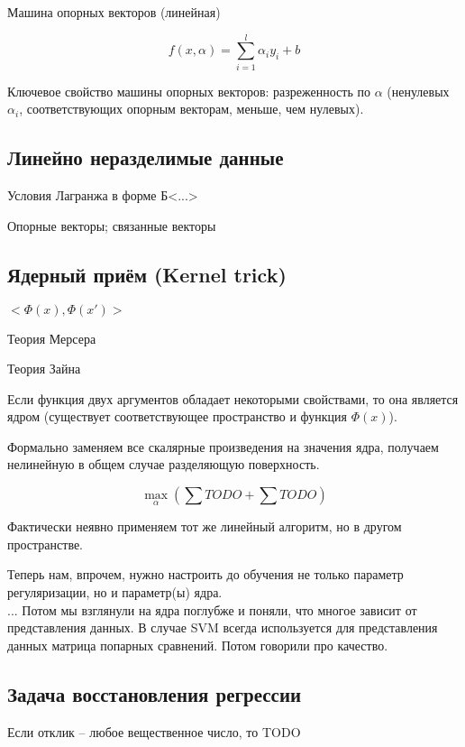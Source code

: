\documentclass[main.tex]{subfiles}
\begin{document}
Машина опорных векторов (линейная)

\[ \boxed{ f(x, \alpha) = \sum_{i=1}^l \alpha_i y_i + b } \]

Ключевое свойство машины опорных векторов: разреженность по $ \alpha $ (ненулевых $ \alpha_i $, соответствующих опорным векторам, меньше, чем нулевых).

\subsection{Линейно неразделимые данные}

Условия Лагранжа в форме Б<...>

Опорные векторы; связанные векторы

\subsection{Ядерный приём (Kernel trick)}

$ < \Phi(x), \Phi(x') > $

Теория Мерсера

Теория Зайна

Если функция двух аргументов обладает некоторыми свойствами, то она является ядром (существует соответствующее пространство и функция $ \Phi(x) $).

Формально заменяем все скалярные произведения на значения ядра, получаем нелинейную в общем случае разделяющую поверхность.

\[ \max_\alpha \left( \sum TODO + \sum TODO \right) \]

Фактически неявно применяем тот же линейный алгоритм, но в другом пространстве.

Теперь нам, впрочем, нужно настроить до обучения не только параметр регуляризации, но и параметр(ы) ядра. \\

... Потом мы взглянули на ядра поглубже и поняли, что многое зависит от представления данных.
В случае SVM всегда используется для представления данных матрица попарных сравнений.
Потом говорили про качество.

\subsection{Задача восстановления регрессии}

Если отклик -- любое вещественное число, то TODO
\end{document}
